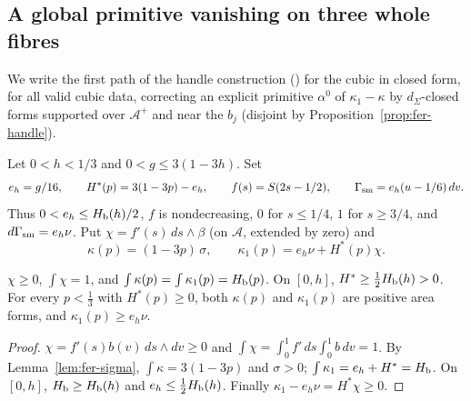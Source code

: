 \subsection{A global primitive vanishing on three whole fibres}\label{sec:fer-alpha1}

We write the first path of the handle construction () for the cubic in closed form, for all valid cubic data, correcting an explicit primitive $\alpha^0$ of $\kappa_1-\kappa$ by $d_\Sigma$-closed forms supported over $\mathcal A^+$ and near the $b_j$ (disjoint by Proposition~\ref{prop:fer-handle}).

\begin{definition}\label{def:fer-kappa}
Let $0<h<1/3$ and $0<g\le3(1-3h)$. Set
\[
 e_h=g/16,\qquad H^*(p)=3(1-3p)-e_h,\qquad
 f(s)=S(2s-1/2),\qquad \Gamma_{\rm sm}=e_h(u-1/6)\,dv.
\]
Thus $0<e_h\le H_{\mathrm b}(h)/2$, $f$ is nondecreasing, $0$ for $s\le1/4$, $1$ for $s\ge3/4$, and $d\Gamma_{\rm sm}=e_h\nu$.
Put $\chi=f'(s)\,ds\wedge\beta$ (on $\mathcal A$, extended by zero) and
\[
 \kappa(p)=(1-3p)\,\sigma,\qquad \kappa_1(p)=e_h\nu+H^*(p)\chi .
\]
\end{definition}

\begin{lemma}\label{lem:fer-kappa}
$\chi\ge0$, $\int\chi=1$, and $\int\kappa(p)=\int\kappa_1(p)=H_{\mathrm b}(p)$. On $[0,h]$, $H^*\ge\frac12H_{\mathrm b}(h)>0$. For every $p<\frac13$
with $H^*(p)\ge0$, both $\kappa(p)$ and $\kappa_1(p)$ are positive area forms, and $\kappa_1(p)\ge e_h\nu$.
\end{lemma}

\begin{proof}
$\chi=f'(s)b(v)\,ds\wedge dv\ge0$ and $\int\chi=\int_0^1f'\,ds\int_0^1b\,dv=1$. By Lemma~\ref{lem:fer-sigma}, $\int\kappa=3(1-3p)$ and $\sigma>0$; $\int\kappa_1=e_h+H^*=H_{\mathrm b}$. On $[0,h]$, $H_{\mathrm b}\ge H_{\mathrm b}(h)$ and $e_h\le\frac12H_{\mathrm b}(h)$. Finally $\kappa_1-e_h\nu=H^*\chi\ge0$.
\end{proof}

